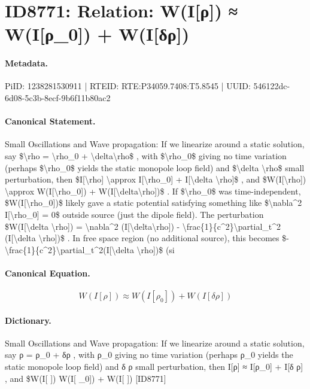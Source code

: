 \section*{ID8771: Relation: W(I[ρ]) ≈ W(I[ρ\_0]) + W(I[δρ])}
\paragraph{Metadata.}
PiID: 1238281530911 | RTEID: RTE:P34059.7408:T5.8545 | UUID: 546122dc-6d08-5c3b-8ecf-9b6f11b80ac2

\paragraph{Canonical Statement.}
Small Oscillations and Wave propagation: If we linearize around a static solution, say \$\textbackslash{}rho = \textbackslash{}rho\_0 + \textbackslash{}delta\textbackslash{}rho\$ , with \$\textbackslash{}rho\_0\$ giving no time variation (perhaps \$\textbackslash{}rho\_0\$ yields the static monopole loop field) and \$\textbackslash{}delta \textbackslash{}rho\$ small perturbation, then \$I[\textbackslash{}rho] \textbackslash{}approx I[\textbackslash{}rho\_0] + I[\textbackslash{}delta \textbackslash{}rho]\$ , and \$W(I[\textbackslash{}rho]) \textbackslash{}approx W(I[\textbackslash{}rho\_0]) + W(I[\textbackslash{}delta\textbackslash{}rho])\$ . If \$\textbackslash{}rho\_0\$ was time-independent, \$W(I[\textbackslash{}rho\_0])\$ likely gave a static potential satisfying something like \$\textbackslash{}nabla\textasciicircum{}2 I[\textbackslash{}rho\_0] = 0\$ outside source (just the dipole field). The perturbation \$W(I[\textbackslash{}delta \textbackslash{}rho]) = \textbackslash{}nabla\textasciicircum{}2 (I[\textbackslash{}delta\textbackslash{}rho]) - \textbackslash{}frac\{1\}\{c\textasciicircum{}2\}\textbackslash{}partial\_t\textasciicircum{}2 (I[\textbackslash{}delta \textbackslash{}rho])\$ . In free space region (no additional source), this becomes \$-\textbackslash{}frac\{1\}\{c\textasciicircum{}2\}\textbackslash{}partial\_t\textasciicircum{}2(I[\textbackslash{}delta \textbackslash{}rho])\$ (si

\paragraph{Canonical Equation.}
\[
W(I[\rho]) \approx W(I[\rho_0]) + W(I[\delta\rho])
\]

\paragraph{Dictionary.}
Small Oscillations and Wave propagation: If we linearize around a static solution, say ρ = ρ\_0 + δρ , with ρ\_0 giving no time variation (perhaps ρ\_0 yields the static monopole loop field) and δ ρ small perturbation, then I[ρ] ≈ I[ρ\_0] + I[δ ρ] , and \$W(I[ ]) W(I[ \_0]) + W(I[ ]) [ID8771]

